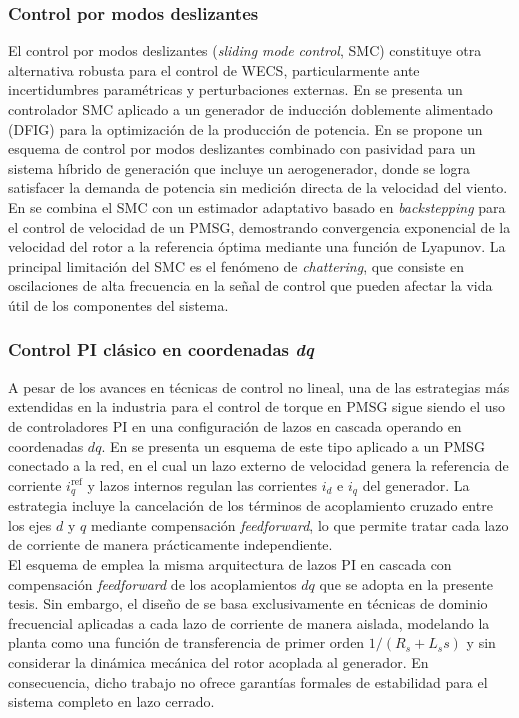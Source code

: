 \subsubsection*{Control por modos deslizantes}
El control por modos deslizantes (\emph{sliding mode control}, SMC) 
constituye otra alternativa robusta para el control de WECS, particularmente 
ante incertidumbres paramétricas y perturbaciones externas. En 
\cite{Boukezzar2008} se presenta un controlador SMC aplicado a un generador 
de inducción doblemente alimentado (DFIG) para la optimización de la 
producción de potencia. En \cite{Valenciaga2003} se propone un esquema de 
control por modos deslizantes combinado con pasividad para un sistema 
híbrido de generación que incluye un aerogenerador, donde se logra 
satisfacer la demanda de potencia sin medición directa de la velocidad del 
viento. En \cite{Kim2019} se combina el SMC con un estimador adaptativo 
basado en \emph{backstepping} para el control de velocidad de un PMSG, 
demostrando convergencia exponencial de la velocidad del rotor a la 
referencia óptima mediante una función de Lyapunov. La principal limitación 
del SMC es el fenómeno de \emph{chattering}, que consiste en oscilaciones 
de alta frecuencia en la señal de control que pueden afectar la vida útil 
de los componentes del sistema.

\subsubsection*{Control PI clásico en coordenadas \emph{dq}}
A pesar de los avances en técnicas de control no lineal, una de las 
estrategias más extendidas en la industria para el control de torque en 
PMSG sigue siendo el uso de controladores PI en una configuración de lazos 
en cascada operando en coordenadas $dq$. En \cite{chinchilla2006} se 
presenta un esquema de este tipo aplicado a un PMSG conectado a la red, en 
el cual un lazo externo de velocidad genera la referencia de corriente 
$i_q^{\text{ref}}$ y lazos internos regulan las corrientes $i_d$ e $i_q$ 
del generador. La estrategia incluye la cancelación de los términos de 
acoplamiento cruzado entre los ejes $d$ y $q$ mediante compensación 
\emph{feedforward}, lo que permite tratar cada lazo de corriente de manera 
prácticamente independiente. 
\\

El esquema de \cite{chinchilla2006} emplea la misma arquitectura de lazos PI en 
cascada con compensación \textit{feedforward} de los acoplamientos $dq$ que se 
adopta en la presente tesis. Sin embargo, el diseño de \cite{chinchilla2006} se 
basa exclusivamente en técnicas de dominio frecuencial aplicadas a cada lazo de 
corriente de manera aislada, modelando la planta como una función de 
transferencia de primer orden $1/(R_s + L_s s)$ y sin considerar la dinámica 
mecánica del rotor acoplada al generador. En consecuencia, dicho trabajo no 
ofrece garantías formales de estabilidad para el sistema completo en lazo 
cerrado.

